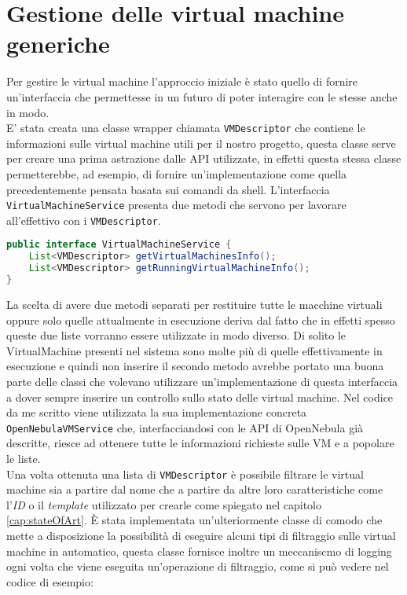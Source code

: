 \section{Gestione delle virtual machine generiche}
Per gestire le virtual machine l'approccio iniziale è stato quello di fornire un'interfaccia che permettesse in un futuro di poter interagire con le stesse anche in modo.\\
E' stata creata una classe wrapper chiamata \texttt{VMDescriptor} che contiene le informazioni sulle virtual machine utili per il nostro progetto, questa classe serve per creare una prima astrazione dalle API utilizzate, in effetti questa stessa classe permetterebbe, ad esempio, di fornire un'implementazione come quella precedentemente pensata basata sui comandi da shell.
L'interfaccia \texttt{VirtualMachineService} presenta due metodi che servono per lavorare all'effettivo con i \texttt{VMDescriptor}.
\begin{lstlisting}[language=Java, caption=VirtualMachineService, label=code:VirtualMachineService]
public interface VirtualMachineService {
    List<VMDescriptor> getVirtualMachinesInfo();
    List<VMDescriptor> getRunningVirtualMachineInfo();
}
\end{lstlisting}
La scelta di avere due metodi separati per restituire tutte le macchine virtuali oppure solo quelle attualmente in esecuzione deriva dal fatto che in effetti spesso queste due liste vorranno essere utilizzate in modo diverso. Di solito le VirtualMachine presenti nel sistema sono molte più di quelle effettivamente in esecuzione e quindi non inserire il secondo metodo avrebbe portato una buona parte delle classi che volevano utilizzare un'implementazione di questa interfaccia a dover sempre inserire un controllo sullo stato delle virtual machine.
Nel codice da me scritto viene utilizzata la sua implementazione concreta \texttt{OpenNebulaVMService} che, interfacciandosi con le API di OpenNebula già descritte, riesce ad ottenere tutte le informazioni richieste sulle VM e a popolare le liste.\\
Una volta ottenuta una lista di \texttt{VMDescriptor} è possibile filtrare le virtual machine sia a partire dal nome che a partire da altre loro caratteristiche come l'\emph{ID} o il \emph{template} utilizzato per crearle come spiegato nel capitolo \ref{cap:stateOfArt}.
È stata implementata un'ulteriormente classe di comodo che mette a disposizione la possibilità di eseguire alcuni tipi di filtraggio sulle virtual machine in automatico, questa classe fornisce inoltre un meccaniscmo di logging ogni volta che viene eseguita un'operazione di filtraggio, come si può vedere nel codice di esempio:
